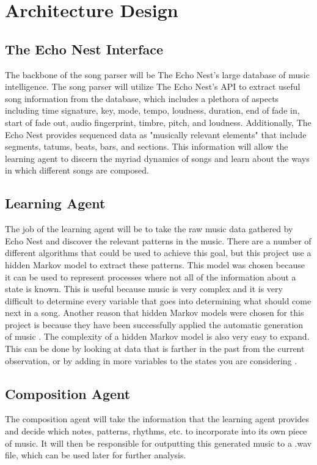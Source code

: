 \documentclass{article}
\begin{document}
\section{Architecture Design}
\subsection{The Echo Nest Interface}
The backbone of the song parser will be The Echo Nest's large database of music intelligence. The song parser will utilize The Echo Nest's API to extract useful song information from the database, which includes a plethora of aspects including time signature, key, mode, tempo, loudness, duration, end of fade in, start of fade out, audio fingerprint, timbre, pitch, and loudness. Additionally, The Echo Nest provides sequenced data as "musically relevant elements" that include segments, tatums, beats, bars, and sections. This information will allow the learning agent to discern the myriad dynamics of songs and learn about the ways in which different songs are composed.

\subsection{Learning Agent}
The job of the learning agent will be to take the raw music data gathered by Echo Nest and discover the relevant patterns in the music. There are a number of different algorithms that could be used to achieve this goal, but this project use a hidden Markov model to extract these patterns. This model was chosen because it can be used to represent processes where not all of the information about a state is known. This is useful because music is very complex and it is very difficult to determine every variable that goes into determining what should come next in a song. Another reason that hidden Markov models were chosen for this project is because they have been successfully applied the automatic generation of music \cite{5492670}. The complexity of a hidden Markov model is also very easy to expand. This can be done by looking at data that is farther in the past from the current observation, or by adding in more variables to the states you are considering \cite{Wiki}.\\

\subsection{Composition Agent}
The composition agent will take the information that the learning agent provides and decide which notes, patterns, rhythms, etc. to incorporate into its own piece of music. It will then be responsible for outputting this generated music to a .wav file, which can be used later for further analysis.
\end{document}
